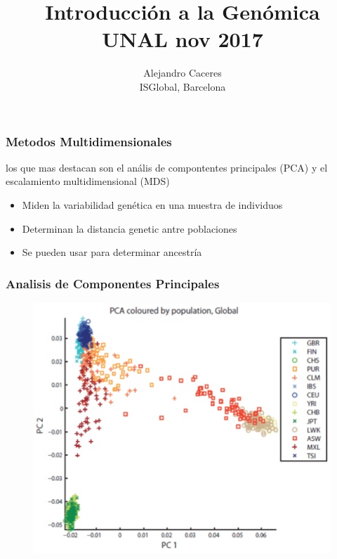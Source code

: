 \documentclass{beamer}\usepackage[]{graphicx}\usepackage[]{color}
\begin{document}
\title{Introducci\'on a la Gen\'omica \\ UNAL nov 2017}
\author{Alejandro Caceres \\ ISGlobal, Barcelona}


\maketitle

\begin{frame}[fragile]
\frametitle{Metodos Multidimensionales}
los que mas destacan son el an\'alis de compontentes principales (PCA) y el escalamiento multidimensional (MDS)
\begin{itemize}
\item Miden la variabilidad gen\'etica en una muestra de individuos
\item Determinan la distancia genetic antre poblaciones
\item Se pueden usar para determinar ancestr\'ia 
\end{itemize}
\end{frame}

\begin{frame}[fragile]
\frametitle{Analisis de Componentes Principales}

\begin{figure}[htbp]
\begin{center}
\includegraphics[width=.5\linewidth]{pca1000g.jpg}
\end{center}
\end{figure}
\end{frame}
\end{document}
